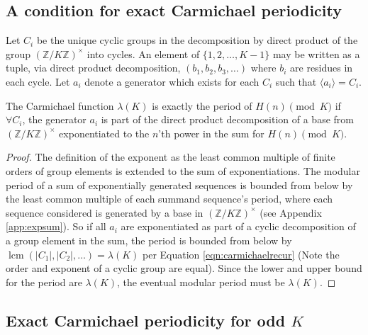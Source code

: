 \documentclass[12pt,reqno]{article}
\DeclareMathOperator{\lcm}{lcm}
\begin{document}
\subsection{A condition for exact Carmichael periodicity}
Let $C_{i}$ be the unique cyclic groups in the decomposition by direct product of the group $(\mathbb{Z}/K\mathbb{Z})^{\times}$ into cycles. An element of $\{1, 2, \ldots, K - 1\}$ may be written as a tuple, via direct product decomposition,  $(b_{1}, b_{2}, b_{3}, \ldots)$ where $b_{i}$ are residues in each cycle. Let $a_{i}$ denote a generator which exists for each $C_{i}$ such that $\langle a_{i} \rangle = C_{i}$.
\begin{theorem}\label{thm:exactcarm}
	The Carmichael function $\lambda(K)$ is exactly the period of $H(n) \pmod{K}$ if  \   $\forall C_{i}$, the generator $a_{i}$ is part of the direct product decomposition of a base from $(\mathbb{Z}/K\mathbb{Z})^{\times}$ exponentiated to the $n$'th power in the sum for $H(n) \pmod{K}$.
\end{theorem}
\begin{proof}
	The definition of the exponent as the least common multiple of finite orders of group elements is extended to the sum of exponentiations. The modular period of a sum of exponentially generated sequences is bounded from below by the least common multiple of each summand sequence's period, where each sequence considered is generated by a base in $(\mathbb{Z}/K\mathbb{Z})^{\times}$ (see Appendix \ref{app:expsum}). So if all $a_{i}$ are exponentiated as part of a cyclic decomposition of a group element in the sum, the period is bounded from below by $\lcm(|C_{1}|, |C_{2}|, \ldots) = \lambda(K)$ per Equation \ref{eqn:carmichaelrecur} (Note the order and exponent of a cyclic group are equal). Since the lower and upper bound for the period are $\lambda(K)$, the eventual modular period must be $\lambda(K)$.
\end{proof}

\subsection{Exact Carmichael periodicity for odd $K$}
\end{document}
